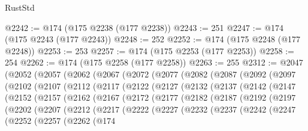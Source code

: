 \begin{lexlean}{RustStd}
\begin{coremodule}
@2242 := @174 (@175 @2238 (@177 @2238))
@2243 := 251
@2247 := @174 (@175 @2243 (@177 @2243))
@2248 := 252
@2252 := @174 (@175 @2248 (@177 @2248))
@2253 := 253
@2257 := @174 (@175 @2253 (@177 @2253))
@2258 := 254
@2262 := @174 (@175 @2258 (@177 @2258))
@2263 := 255
@2312 := @2047
    (@2052
      (@2057
        (@2062
          (@2067
            (@2072
              (@2077
                (@2082
                  (@2087
                    (@2092
                      (@2097
                        (@2102
                          (@2107
                            (@2112
                              (@2117
                                (@2122
                                  (@2127
                                    (@2132
                                      (@2137
                                        (@2142
                                          (@2147
                                            (@2152
                                              (@2157
                                                (@2162
                                                  (@2167
                                                    (@2172
                                                      (@2177
                                                        (@2182
                                                          (@2187
                                                            (@2192
                                                              (@2197
                                                                (@2202
                                                                  (@2207
                                                                    (@2212
                                                                      (@2217
                                                                        (@2222
                                                                          (@2227
                                                                            (@2232
                                                                              (@2237
                                                                                (@2242
                                                                                  (@2247
                                                                                    (@2252
                                                                                      (@2257
                                                                                        (@2262
                                                                                          (@174

\end{coremodule}
\end{lexlean}
